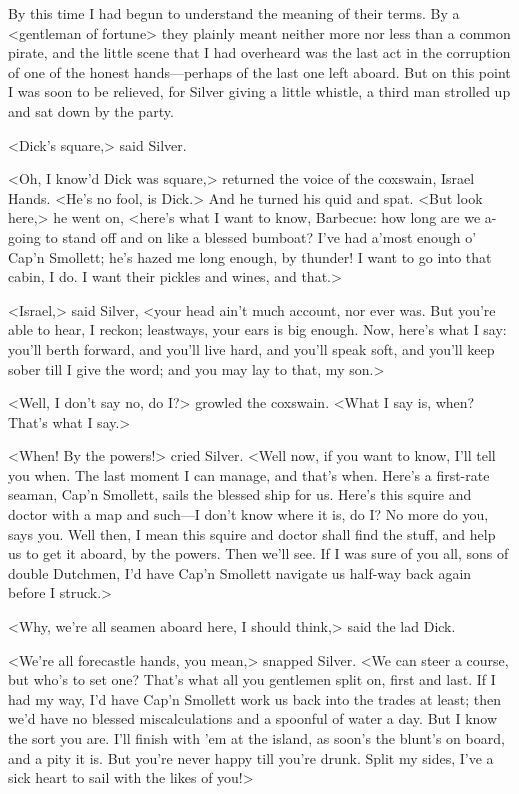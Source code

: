 By this time I had begun to understand the meaning of their terms. By a <gentleman of fortune> they plainly meant neither more nor less than a common pirate, and the little scene that I had overheard was the last act in the corruption of one of the honest hands—perhaps of the last one left aboard. But on this point I was soon to be relieved, for Silver giving a little whistle, a third man strolled up and sat down by the party.

<Dick's square,> said Silver.

<Oh, I know'd Dick was square,> returned the voice of the coxswain, Israel Hands. <He's no fool, is Dick.> And he turned his quid and spat. <But look here,> he went on, <here's what I want to know, Barbecue: how long are we a-going to stand off and on like a blessed bumboat? I've had a'most enough o' Cap'n Smollett; he's hazed me long enough, by thunder! I want to go into that cabin, I do. I want their pickles and wines, and that.>

<Israel,> said Silver, <your head ain't much account, nor ever was. But you're able to hear, I reckon; leastways, your ears is big enough. Now, here's what I say: you'll berth forward, and you'll live hard, and you'll speak soft, and you'll keep sober till I give the word; and you may lay to that, my son.>

<Well, I don't say no, do I\@?> growled the coxswain. <What I say is, when? That's what I say.>

<When! By the powers!> cried Silver. <Well now, if you want to know, I'll tell you when. The last moment I can manage, and that's when. Here's a first-rate seaman, Cap'n Smollett, sails the blessed ship for us. Here's this squire and doctor with a map and such—I don't know where it is, do I\@? No more do you, says you. Well then, I mean this squire and doctor shall find the stuff, and help us to get it aboard, by the powers. Then we'll see. If I was sure of you all, sons of double Dutchmen, I'd have Cap'n Smollett navigate us half-way back again before I struck.>

<Why, we're all seamen aboard here, I should think,> said the lad Dick.

<We're all forecastle hands, you mean,> snapped Silver. <We can steer a course, but who's to set one? That's what all you gentlemen split on, first and last. If I had my way, I'd have Cap'n Smollett work us back into the trades at least; then we'd have no blessed miscalculations and a spoonful of water a day. But I know the sort you are. I'll finish with 'em at the island, as soon's the blunt's on board, and a pity it is. But you're never happy till you're drunk. Split my sides, I've a sick heart to sail with the likes of you!>

